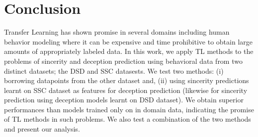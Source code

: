 \documentclass{article}
\begin{document}
%

\section{Conclusion}

Transfer Learning has shown promise in several domains including human behavior modeling where it can be expensive and time prohibitive to obtain large amounts of appropriately labeled data.
In this work, we apply TL methods to the problems of sincerity and deception prediction using behavioral data from two distinct datasets; the DSD and SSC datasests. 
We test two methods: (i) borrowing datapoints from the other dataset and, (ii) using sincerity predictions learnt on SSC dataset as features for deception prediction (likewise for sincerity prediction using deception models learnt on DSD dataset). 
We obtain superior performances than models trained only on in domain data, indicating the promise of TL methods in such problems. 
We also test a combination of the two methods and present our analysis.
\end{document}
